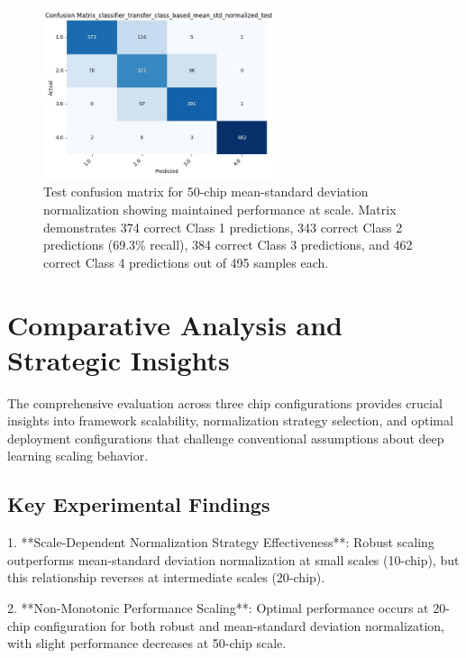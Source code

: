 \begin{figure}[H]
\centering
\includegraphics[width=0.6\textwidth]{out/50chips/class_based_mean_std_normalized/confusion_matrix_classifier_transfer_class_based_mean_std_normalized_test_eval.jpg}
\caption{Test confusion matrix for 50-chip mean-standard deviation normalization showing maintained performance at scale. Matrix demonstrates 374 correct Class 1 predictions, 343 correct Class 2 predictions (69.3\% recall), 384 correct Class 3 predictions, and 462 correct Class 4 predictions out of 495 samples each.}
\label{fig:50chip_confusion_matrix}
\end{figure}

\section{Comparative Analysis and Strategic Insights}
\label{sec:comparative_analysis}

The comprehensive evaluation across three chip configurations provides crucial insights into framework scalability, normalization strategy selection, and optimal deployment configurations that challenge conventional assumptions about deep learning scaling behavior.

\subsection{Key Experimental Findings}

1. **Scale-Dependent Normalization Strategy Effectiveness**: Robust scaling outperforms mean-standard deviation normalization at small scales (10-chip), but this relationship reverses at intermediate scales (20-chip).

2. **Non-Monotonic Performance Scaling**: Optimal performance occurs at 20-chip configuration for both robust and mean-standard deviation normalization, with slight performance decreases at 50-chip scale.

